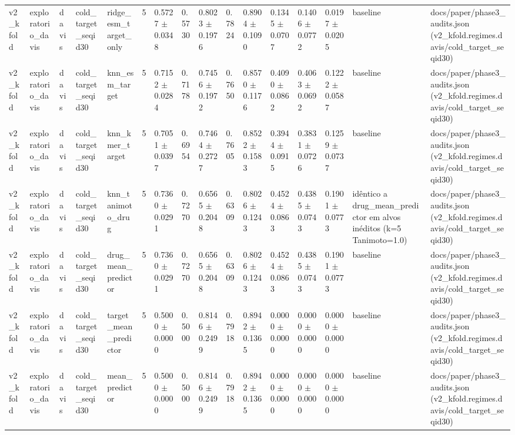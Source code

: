 \begin{table}[htbp]
\begin{tabular}{llllllllllllllll}
v2\_kfold & exploratorio\_davis & davis & cold\_target\_seqid30 & ridge\_esm\_target\_only & 5 & 0.5727 $\pm$ 0.0348 & 0.5730 & 0.8023 $\pm$ 0.1976 & 0.7824 & 0.8904 $\pm$ 0.1090 & 0.1345 $\pm$ 0.0707 & 0.1406 $\pm$ 0.0772 & 0.0197 $\pm$ 0.0205 & baseline & docs/paper/phase3\_audits.json (v2\_kfold.regimes.davis/cold\_target\_seqid30) \\
v2\_kfold & exploratorio\_davis & davis & cold\_target\_seqid30 & knn\_esm\_target & 5 & 0.7152 $\pm$ 0.0284 & 0.7178 & 0.7456 $\pm$ 0.1972 & 0.7650 & 0.8570 $\pm$ 0.1176 & 0.4090 $\pm$ 0.0862 & 0.4063 $\pm$ 0.0692 & 0.1222 $\pm$ 0.0587 & baseline & docs/paper/phase3\_audits.json (v2\_kfold.regimes.davis/cold\_target\_seqid30) \\
v2\_kfold & exploratorio\_davis & davis & cold\_target\_seqid30 & knn\_kmer\_target & 5 & 0.7051 $\pm$ 0.0397 & 0.6954 & 0.7464 $\pm$ 0.2727 & 0.7605 & 0.8522 $\pm$ 0.1583 & 0.3944 $\pm$ 0.0915 & 0.3831 $\pm$ 0.0726 & 0.1259 $\pm$ 0.0737 & baseline & docs/paper/phase3\_audits.json (v2\_kfold.regimes.davis/cold\_target\_seqid30) \\
v2\_kfold & exploratorio\_davis & davis & cold\_target\_seqid30 & knn\_tanimoto\_drug & 5 & 0.7360 $\pm$ 0.0291 & 0.7270 & 0.6565 $\pm$ 0.2048 & 0.6309 & 0.8026 $\pm$ 0.1243 & 0.4524 $\pm$ 0.0863 & 0.4385 $\pm$ 0.0743 & 0.1901 $\pm$ 0.0773 & idêntico a drug\_mean\_predictor em alvos inéditos (k=5 Tanimoto=1.0) & docs/paper/phase3\_audits.json (v2\_kfold.regimes.davis/cold\_target\_seqid30) \\
v2\_kfold & exploratorio\_davis & davis & cold\_target\_seqid30 & drug\_mean\_predictor & 5 & 0.7360 $\pm$ 0.0291 & 0.7270 & 0.6565 $\pm$ 0.2048 & 0.6309 & 0.8026 $\pm$ 0.1243 & 0.4524 $\pm$ 0.0863 & 0.4385 $\pm$ 0.0743 & 0.1901 $\pm$ 0.0773 & baseline & docs/paper/phase3\_audits.json (v2\_kfold.regimes.davis/cold\_target\_seqid30) \\
v2\_kfold & exploratorio\_davis & davis & cold\_target\_seqid30 & target\_mean\_predictor & 5 & 0.5000 $\pm$ 0.0000 & 0.5000 & 0.8146 $\pm$ 0.2499 & 0.7918 & 0.8942 $\pm$ 0.1365 & 0.0000 $\pm$ 0.0000 & 0.0000 $\pm$ 0.0000 & 0.0000 $\pm$ 0.0000 & baseline & docs/paper/phase3\_audits.json (v2\_kfold.regimes.davis/cold\_target\_seqid30) \\
v2\_kfold & exploratorio\_davis & davis & cold\_target\_seqid30 & mean\_predictor & 5 & 0.5000 $\pm$ 0.0000 & 0.5000 & 0.8146 $\pm$ 0.2499 & 0.7918 & 0.8942 $\pm$ 0.1365 & 0.0000 $\pm$ 0.0000 & 0.0000 $\pm$ 0.0000 & 0.0000 $\pm$ 0.0000 & baseline & docs/paper/phase3\_audits.json (v2\_kfold.regimes.davis/cold\_target\_seqid30) \\

\end{tabular}
\end{table}
